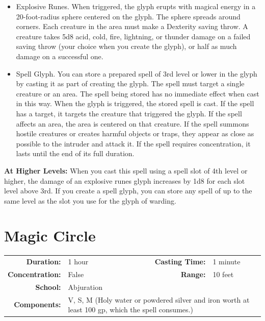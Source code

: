 \documentclass[12pt,showtrims]{memoir}
\begin{document}
\begin{itemize}
\item Explosive Runes. When triggered, the glyph erupts with magical energy in a 20-foot-radius sphere centered on the glyph. The sphere spreads around corners. Each creature in the area must make a Dexterity saving throw. A creature takes 5d8 acid, cold, fire, lightning, or thunder damage on a failed saving throw (your choice when you create the glyph), or half as much damage on a successful one. 

\item Spell Glyph. You can store a prepared spell of 3rd level or lower in the glyph by casting it as part of creating the glyph. The spell must target a single creature or an area. The spell being stored has no immediate effect when cast in this way. When the glyph is triggered, the stored spell is cast. If the spell has a target, it targets the creature that triggered the glyph. If the spell affects an area, the area is centered on that creature. If the spell summons hostile creatures or creates harmful objects or traps, they appear as close as possible to the intruder and attack it. If the spell requires concentration, it lasts until the end of its full duration.
\end{itemize}

\enlargethispage{1\baselineskip}
\vspace{8pt} \noindent\textbf{At Higher Levels:} When you cast this spell using a spell slot of 4th level or higher, the damage of an explosive runes glyph increases by 1d8 for each slot level above 3rd. If you create a spell glyph, you can store any spell of up to the same level as the slot you use for the glyph of warding.


\newpage
\section*{Magic Circle}

{
\small\centering\vspace{-6pt}
\begin{tabular}{rlrl}
\toprule

\textbf{Duration:} & 1 hour &
\textbf{Casting Time:} & 1 minute \\
\textbf{Concentration:} & False &
\textbf{Range:} & 10 feet \\
\textbf{School:} & Abjuration \\
\textbf{Components:} & \multicolumn{3}{p{0.7\textwidth}}{V, S, M (Holy water or powdered silver and iron worth at least 100 gp, which the spell consumes.)}\\

\bottomrule
\end{tabular}
}
\end{document}

